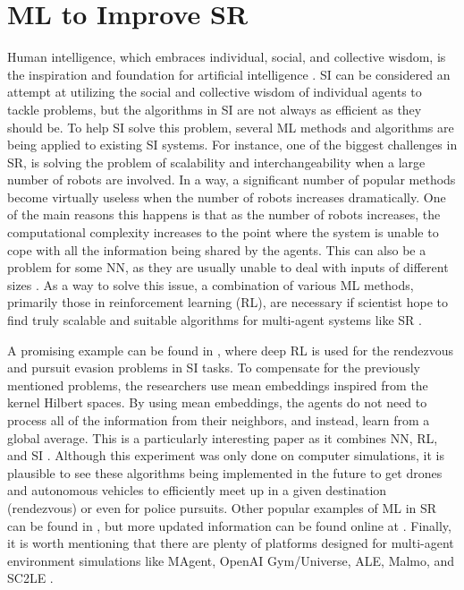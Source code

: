\documentclass[twocolumn]{bmcart}%
\begin{document}
\section*{ML to Improve SR}

Human intelligence, which embraces individual, social, and collective wisdom, is the inspiration and foundation for artificial intelligence \cite{Zheng2017}. SI can be considered an attempt at utilizing the social and collective wisdom of individual agents to tackle problems, but the algorithms in SI are not always as efficient as they should be. To help SI solve this problem, several ML methods and algorithms are being applied to existing SI systems. For instance, one of the biggest challenges in SR, is solving the problem of scalability and interchangeability when a large number of robots are involved. In a way, a significant number of popular methods become virtually useless when the number of robots increases dramatically. One of the main reasons this happens is that as the number of robots increases, the computational complexity increases to the point where the system is unable to cope with all the information being shared by the agents. This can also be a problem for some NN, as they are usually unable to deal with inputs of different sizes \cite{Max}. As a way to solve this issue, a combination of various ML methods, primarily those in reinforcement learning (RL), are necessary if scientist hope to find truly scalable and suitable algorithms for multi-agent systems like SR \cite{Lowe}.

A promising example can be found in \cite{Max2}, where deep RL is used for the rendezvous and pursuit evasion problems in SI tasks. To compensate for the previously mentioned problems, the researchers use mean embeddings inspired from the kernel Hilbert spaces. By using mean embeddings, the agents do not need to process all of the information from their neighbors, and instead, learn from a global average. This is a particularly interesting paper as it combines NN, RL, and SI \cite{Max}. Although this experiment was only done on computer simulations, it is plausible to see these algorithms being implemented in the future to get drones and autonomous vehicles to efficiently meet up in a given destination (rendezvous) or even for police pursuits. Other popular examples of ML in SR can be found in \cite{Amigo}, but more updated information can be found online at \cite{RoboCup}. Finally, it is worth mentioning that there are plenty of platforms designed for multi-agent environment simulations like MAgent, OpenAI Gym/Universe, ALE, Malmo, and SC2LE \cite{Zheng2017}.
\end{document}
